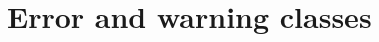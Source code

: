 \documentclass{manual}
\makeatletter
\let\py@OldOldChapter=\chapter
\renewcommand{\chapter}{\py@reset%
                        \py@OldOldChapter}
\makeatother
\begin{document}
\chapter[\protect\module{pygsl.errors} --- Error and warning classes]
{\protect{} \\ Error and warning classes} 
\label{cha:error-module}



\end{document}

